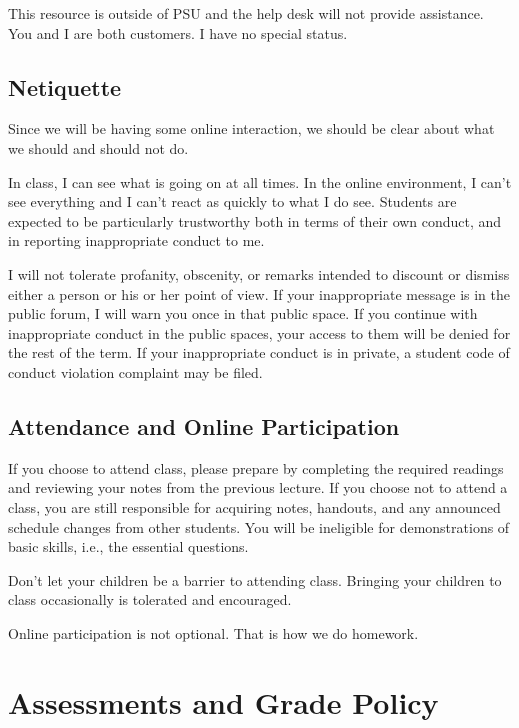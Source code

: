 \documentclass[letterpaper,10pt]{article}
\newif\ifonline
\begin{document}
This resource is outside of PSU and the help desk will not provide
assistance.  You and I are both customers. I have no special status.

\subsection{Netiquette}
Since we will be having some online interaction, we should be clear
about what we should and should not do.

In class, I can see what is going on at all times.  In the online
environment, I can't see everything and I can't react as quickly to
what I do see.  Students are expected to be particularly trustworthy
both in terms of their own conduct, and in reporting inappropriate
conduct to me.

I will not tolerate profanity, obscenity, or remarks intended to
discount or dismiss either a person or his or her point of view. If your inappropriate message is in the public forum, I will warn you
once in that public space. If you continue with inappropriate conduct
in the public spaces, your access to them will be denied for the rest
of the term. If your inappropriate
conduct is in private, a student code of conduct violation complaint
may be filed.

\ifonline

\else
   \subsection{Attendance and Online Participation}
   
   If you choose to attend class, please prepare by completing the required readings and reviewing your notes from the previous lecture. If you choose not to attend a class, you are still responsible for acquiring notes, handouts, and any announced schedule changes from other students. You will be ineligible for demonstrations of basic skills, i.e., the essential questions. 
   
   Don’t let your children be a barrier to attending class. Bringing your children to class occasionally is tolerated and encouraged.
  
  Online participation is not optional. That is how we do homework.

\fi

\section{Assessments and Grade Policy}
\end{document}
